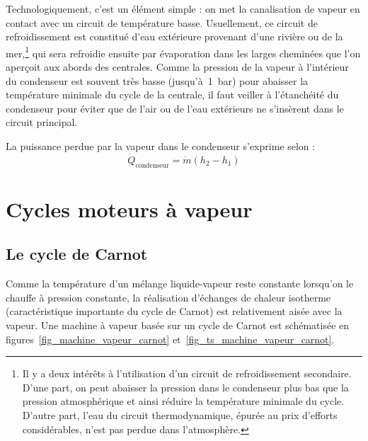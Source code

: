 		Technologiquement, c’est un élément simple : on met la canalisation de vapeur en contact avec un circuit de température basse. Usuellement, ce circuit de refroidissement est constitué d’eau extérieure provenant d’une rivière ou de la mer,\footnote{Il y a deux intérêts à l’utilisation d’un circuit de refroidissement secondaire. D’une part, on peut abaisser la pression dans le condenseur plus bas que la pression atmosphérique et ainsi réduire la température minimale du cycle. D’autre part, l’eau du circuit thermodynamique, épurée au prix d’efforts considérables, n’est pas perdue dans l’atmosphère.}
		qui sera refroidie ensuite par évaporation dans les larges cheminées que l’on aperçoit aux abords des centrales. Comme la pression de la vapeur à l’intérieur du condenseur est souvent très basse (jusqu’à~\SI{1}{\bar}) pour abaisser la température minimale du cycle de la centrale, il faut veiller à l’étanchéité du condenseur pour éviter que de l’air ou de l’eau extérieurs ne s’insèrent dans le circuit principal.

		La puissance perdue par la vapeur dans le condenseur s’exprime selon :
		\begin{equation}
			\dot{Q}_\text{condenseur} = \dot{m} (h_2 - h_1)
		\end{equation}





\section{Cycles moteurs à vapeur}



	\subsection{Le cycle de Carnot}

		Comme la température d’un mélange liquide-vapeur reste constante lorsqu’on le chauffe à pression constante, la réalisation d’échanges de chaleur isotherme (caractéristique importante du cycle de Carnot) est relativement aisée avec la vapeur. Une machine à vapeur basée sur un cycle de Carnot est schématisée en figures~\ref{fig_machine_vapeur_carnot} et~\ref{fig_ts_machine_vapeur_carnot}.


